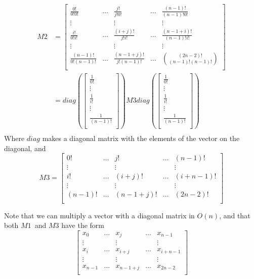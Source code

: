 \documentclass{article}
\begin{document}
\begin{align*}
M2	&= \left[\begin{array}{ccccc}
	\frac{0!}{0!0!}		&\dots	&\frac{j!}{j!0!}		&\dots	&\frac{(n-1)!}{(n-1)!0!}\\
	\vdots			&	&\vdots				&	&\vdots\\
	\frac{i!}{0!i!}		&\dots	&\frac{(i+j)!}{j!i!}		&\dots	&\frac{(n-1+i)!}{(n-1)!i!}\\
	\vdots			&	&\vdots				&	&\vdots\\
	\frac{(n-1)!}{0!(n-1)!}	&\dots	&\frac{(n-1+j)!}{j!(n-1)!}	&\dots	&\binom{(2n-2)!}{(n-1)!(n-1)!}\\
\end{array}\right]\\
	&= diag\left(\begin{bmatrix}
	\frac{1}{0!}\\
	\vdots\\
	\frac{1}{i!}\\
	\vdots\\
	\frac{1}{(n-1)!}\\
	\end{bmatrix}\right) M3 diag\left(\begin{bmatrix}
	\frac{1}{0!}\\
	\vdots\\
	\frac{1}{i!}\\
	\vdots\\
	\frac{1}{(n-1)!}\\
	\end{bmatrix}\right)\\
\end{align*}
Where $diag$ makes a diagonal matrix with the elements of the vector on the diagonal, and
\begin{equation*}
M3 = \left[\begin{array}{ccccc}
	0!	&\dots	&j!		&\dots	&(n-1)!\\
	\vdots	&	&\vdots		&	&\vdots\\
	i!	&\dots	&(i+j)!		&\dots	&(i+n-1)!\\
	\vdots	&	&\vdots		&	&\vdots\\
	(n-1)!	&\dots	&(n-1+j)!	&\dots	&(2n-2)!\\
	\end{array}\right]
\end{equation*}

Note that we can multiply a vector with a diagonal matrix in $O(n)$, and that both $M1$ and $M3$ have the form
\begin{equation*}
\left[\begin{array}{ccccc}
	x_{0}	&\dots	&x_{j}		&\dots	&x_{n-1}\\
	\vdots	&	&\vdots		&	&\vdots\\
	x_{i}	&\dots	&x_{i+j}	&\dots	&x_{i+n-1}\\
	\vdots	&	&\vdots		&	&\vdots\\
	x_{n-1}	&\dots	&x_{n-1+j}	&\dots	&x_{2n-2}\\
	\end{array}\right]
\end{equation*}
\end{document}
